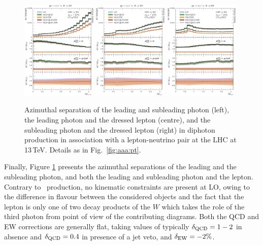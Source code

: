 \begin{figure}[t!]
  \centering
  \includegraphics[width=0.32\textwidth]{figs_aaw/dphi_y1_y2}
  \includegraphics[width=0.32\textwidth]{figs_aaw/dphi_y1_l1}
  \includegraphics[width=0.32\textwidth]{figs_aaw/dphi_y2_l1}
  \caption{
    Azimuthal separation of the leading and subleading photon (left),
    the leading photon and the dressed lepton (centre), and the subleading 
    photon and the dressed lepton (right)
    in diphoton production in association with a lepton-neutrino pair 
    at the LHC at 13\,TeV. 
    Details as in Fig.\ \ref{fig:aaa:pt}.
    \label{fig:aaw:dphi}
  }
\end{figure}

Finally, Figure \ref{fig:aaw:dphi} presents the azimuthal 
separations of the leading and the subleading photon, and 
both the leading and subleading photon and the lepton. 
Contrary to \aaa\ production, no kinematic constraints 
are present at LO, owing to the difference in flavour 
between the considered objects and the fact that the 
lepton is only one of two decay products of the $W$ which 
takes the role of the third photon from point of view of 
the contributing diagrams. 
Both the QCD and EW corrections are generally flat, taking 
values of typically $\delta_\text{QCD}=1-2$ in absence and 
$\delta_\text{QCD}=0.4$ in presence of a jet veto, and 
$\delta_\text{EW}=-2\%$.


